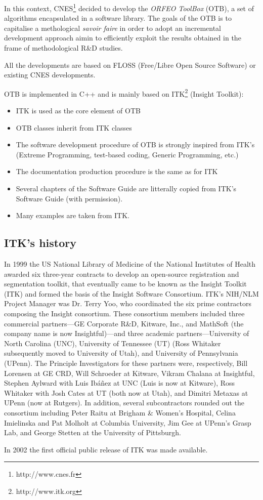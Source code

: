 In this context, CNES\footnote{http://www.cnes.fr} decided to develop
the \emph{ORFEO ToolBox} (OTB), a set of algorithms encapsulated in a
software library. The goals of the OTB is to capitalise a methological
\textit{savoir faire} in order to adopt an incremental development
approach aimin to efficiently exploit the results obtained in the
frame of methodological R\&D studies.

All the developments are based on FLOSS (Free/Libre Open Source
Software) or existing CNES developments.

OTB is implemented in C++ and is mainly based on
ITK\footnote{http://www.itk.org} (Insight Toolkit):
\begin{itemize}
  \item ITK is used as the core element of OTB
  \item OTB classes inherit from ITK classes
  \item The software development procedure of OTB is strongly inspired
  from ITK's (Extreme Programming, test-based coding, Generic
  Programming, etc.)
  \item The documentation production procedure is the same as for ITK
  \item Several chapters of the Software Guide are litterally copied
  from ITK's Software Guide (with permission).
  \item Many examples are taken from ITK.
\end{itemize}

\subsection{ITK's history}
      
In 1999 the US National Library of Medicine of the National Institutes of
Health awarded six three-year contracts to develop an open-source
registration and segmentation toolkit, that eventually came to be known as
the Insight Toolkit (ITK) and formed the basis of the Insight Software
Consortium. ITK's NIH/NLM Project Manager was Dr. Terry Yoo, who coordinated the
six prime contractors composing the Insight consortium. These consortium
members included three commercial partners---GE Corporate R\&D, Kitware,
Inc., and MathSoft (the company name is now Insightful)---and three academic
partners---University of North Carolina (UNC), University of Tennessee (UT)
(Ross Whitaker subsequently moved to University of Utah), and University of
Pennsylvania (UPenn). The Principle Investigators for these partners were,
respectively, Bill Lorensen at GE CRD, Will Schroeder at Kitware, Vikram
Chalana at Insightful, Stephen Aylward with Luis Ib\'a\~nez at UNC (Luis is now
at Kitware), Ross Whitaker with Josh Cates at UT (both now at Utah), and
Dimitri Metaxas at UPenn (now at Rutgers). In addition, several
subcontractors rounded out the consortium including Peter Raitu at Brigham \&
Women's Hospital, Celina Imielinska and Pat Molholt at Columbia University,
Jim Gee at UPenn's Grasp Lab, and George Stetten at the University of
Pittsburgh.

In 2002 the first official public release of ITK was made
available. 

   	


